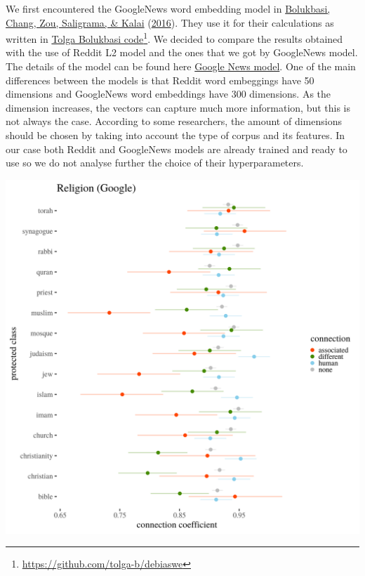 \documentclass[
  12pt,
]{book}
\begin{document}
We first encountered the GoogleNews word embedding model in \protect\hyperlink{ref-Bolukbasi2016Man}{Bolukbasi, Chang, Zou, Saligrama, \& Kalai} (\protect\hyperlink{ref-Bolukbasi2016Man}{2016}). They use it for their calculations as written in \href{https://github.com/tolga-b/debiaswe}{Tolga Bolukbasi code}\footnote{\url{https://github.com/tolga-b/debiaswe}}. We decided to compare the results obtained with the use of Reddit L2 model and the ones that we got by GoogleNews model. The details of the model can be found here \href{https://code.google.com/archive/p/word2vec/}{Google News model}. One of the main differences between the models is that Reddit word embeggings have 50 dimensions and GoogleNews word embeddings have 300 dimensions. As the dimension increases, the vectors can capture much more information, but this is not always the case. According to some researchers, the amount of dimensions should be chosen by taking into account the type of corpus and its features. In our case both Reddit and GoogleNews models are already trained and ready to use so we do not analyse further the choice of their hyperparameters.

\includegraphics[width=14cm]{../images/visReligionGoogle.png}
\end{document}
